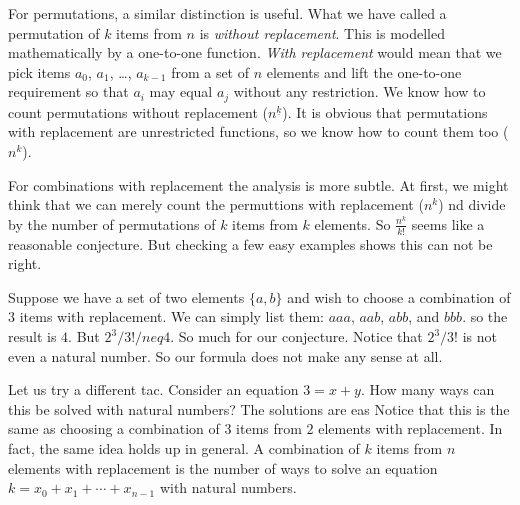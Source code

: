 				For permutations, a similar distinction is useful. What we have called a permutation of $k$ items from $n$ is \emph{without replacement}. This is modelled mathematically by a one-to-one function. \emph{With replacement} would mean that we pick items $a_0$, $a_1$, \ldots, $a_{k-1}$ from a set of $n$ elements and lift the one-to-one requirement so that $a_i$ may equal $a_j$ without any restriction. We know how to count permutations without replacement ($n^{\underline k}$). It is obvious that permutations with replacement are unrestricted functions, so  we know how to count them too ($n^k$). 
				
				For combinations with replacement the analysis is more subtle. At first, we might think that we can merely count the permuttions with replacement ($n^k$) nd divide by the number of permutations of $k$ items from $k$ elements. So $\frac{n^k}{k!}$ seems like a reasonable conjecture. But checking a few easy examples shows this can not be right. 
				
				Suppose we have a set of two elements $\{a,b\}$ and wish to choose a combination of $3$ items with replacement. We can simply list them: $aaa$, $aab$, $abb$, and $bbb$. 
				so the result is $4$. But $2^3/3! /neq 4$. So much for our conjecture. Notice that $2^3/3!$ is not even a natural number. So our formula does not make any sense at all. 
				
				Let us try a different tac. 
				Consider an equation $3 = x + y$. 
				How many ways can this be solved with natural numbers? The solutions are eas
				Notice that this is the same as choosing a combination of $3$ items from $2$ elements with replacement. 
				In fact, the same idea holds up in general. A combination of $k$ items from $n$ elements with replacement is the number of ways to solve an equation $k = x_0 + x_1 +\dotsb + x_{n-1}$ with natural numbers.
				
